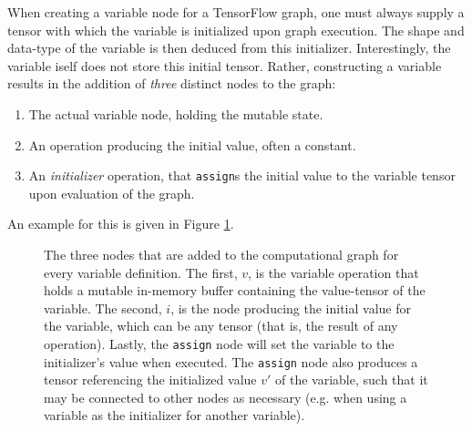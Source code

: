 When creating a variable node for a TensorFlow graph, one must always supply a
tensor with which the variable is initialized upon graph execution. The shape
and data-type of the variable is then deduced from this
initializer. Interestingly, the variable iself does not store this initial
tensor. Rather, constructing a variable results in the addition of \emph{three}
distinct nodes to the graph:

\begin{enumerate}
  \item The actual variable node, holding the mutable state.
  \item An operation producing the initial value, often a constant.
  \item An \emph{initializer} operation, that \texttt{assign}s the initial value
    to the variable tensor upon evaluation of the graph.
\end{enumerate}

An example for this is given in Figure \ref{fig:variable}.

\begin{figure}
  \centering
  \label{fig:variable}
  \caption{The three nodes that are added to the computational graph for every
    variable definition. The first, $v$, is the variable operation that holds a
    mutable in-memory buffer containing the value-tensor of the variable. The
    second, $i$, is the node producing the initial value for the variable, which
    can be any tensor (that is, the result of any operation). Lastly, the
    \texttt{assign} node will set the variable to the initializer's value when
    executed. The \texttt{assign} node also produces a tensor referencing the
    initialized value $v'$ of the variable, such that it may be connected to
    other nodes as necessary (e.g. when using a variable as the initializer for
    another variable). }
\end{figure}

